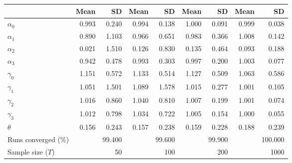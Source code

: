 
\begin{tabular}[t]{lrrrrrrrr}
\toprule
  & Mean & SD & Mean  & SD  & Mean   & SD   & Mean    & SD   \\
\midrule
$\alpha_{0}$ & 0.993 & 0.240 & 0.994 & 0.138 & 1.000 & 0.091 & 0.999 & 0.038\\
$\alpha_{1}$ & 0.890 & 1.103 & 0.966 & 0.651 & 0.983 & 0.366 & 1.008 & 0.142\\
$\alpha_{2}$ & 0.021 & 1.510 & 0.126 & 0.830 & 0.135 & 0.464 & 0.093 & 0.188\\
$\alpha_{3}$ & 0.942 & 0.478 & 0.993 & 0.303 & 0.997 & 0.200 & 1.003 & 0.077\\
$\gamma_{0}$ & 1.151 & 0.572 & 1.133 & 0.514 & 1.127 & 0.509 & 1.063 & 0.586\\
$\gamma_{1}$ & 1.051 & 1.501 & 1.089 & 1.578 & 1.015 & 0.277 & 1.001 & 0.105\\
$\gamma_{2}$ & 1.016 & 0.860 & 1.040 & 0.810 & 1.007 & 0.199 & 1.001 & 0.074\\
$\gamma_{3}$ & 1.012 & 0.798 & 1.034 & 0.722 & 1.005 & 0.154 & 1.000 & 0.055\\
$\theta$ & 0.156 & 0.243 & 0.157 & 0.238 & 0.159 & 0.228 & 0.188 & 0.239\\
Runs converged (\%) &  & 99.400 &  & 99.600 &  & 99.900 &  & 100.000\\
Sample size ($T$) &  & 50 &  & 100 &  & 200 &  & 1000\\
\bottomrule
\end{tabular}
